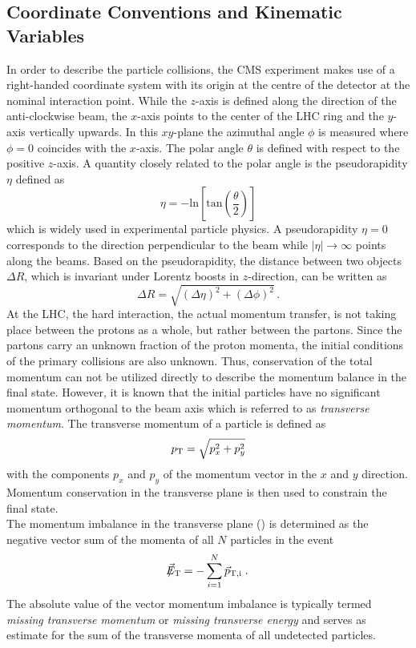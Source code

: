 \subsection{Coordinate Conventions and Kinematic Variables}
\label{subsec:cms_coordinates}
In order to describe the particle collisions, the CMS experiment makes use of a right-handed coordinate system with its origin at the centre of the detector at the nominal interaction point. While the $z$-axis is defined along the direction of the anti-clockwise beam, the $x$-axis points to the center of the LHC ring and the $y$-axis vertically upwards. In this $xy$-plane the azimuthal angle $\phi$ is measured where $\phi = 0$ coincides with the $x$-axis. The polar angle $\theta$ is defined with respect to the positive $z$-axis. A quantity closely related to the polar angle is the pseudorapidity $\eta$ defined as
\begin{equation}
\eta = \mathrm{-ln} \left[\mathrm{tan} \left(\frac{\theta}{2} \right)\right]
\end{equation}
which is widely used in experimental particle physics. A pseudorapidity $\eta = 0$ corresponds to the direction perpendicular to the beam while $|\eta| \rightarrow \infty$ points along the beams. Based on the pseudorapidity, the distance between two objects $\Delta R$, which is invariant under Lorentz boosts in $z$-direction, can be written as
\begin{equation}
\Delta R = \sqrt{(\Delta \eta)^2 + (\Delta \phi)^2} \, .
\end{equation}
At the LHC, the hard interaction, \ie the actual momentum transfer, is not taking place between the protons as a whole, but rather between the partons. Since the partons carry an unknown fraction of the proton momenta, the initial conditions of the primary collisions are also unknown. Thus, conservation of the total momentum can not be utilized directly to describe the momentum balance in the final state. However, it is known that the initial particles have no significant momentum orthogonal to the beam axis which is referred to as \textit{transverse momentum}. The transverse momentum of a particle is defined as 
\begin{equation}
p_{\text{T}} = \sqrt{p_x^2 + p_y^2} 
\end{equation}
with the components $p_x$ and $p_y$ of the momentum vector in the $x$ and $y$ direction. Momentum conservation in the transverse plane is then used to constrain the final state. \\
The momentum imbalance in the transverse plane (\metvec) is determined as the negative vector sum of the momenta of all $N$ particles in the event
\begin{equation}
\slash\mkern-12mu{\vec{E}}_{\text{T}} = - \sum_{i=1}^{N} \vec{p}_\mathrm{T,i} \; .
\end{equation}
The absolute value of the vector momentum imbalance \met is typically termed \textit{missing transverse momentum} or \textit{missing transverse energy} and serves as estimate for the sum of the transverse momenta of all undetected particles.

